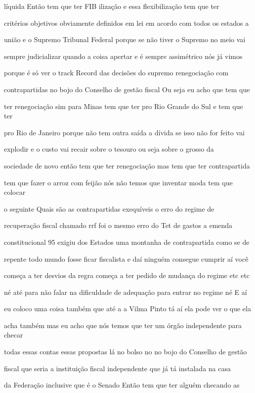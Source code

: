 \documentclass[a4paper,12pt]{article}
\begin{document}
líquida Então tem que ter FIB ilização e essa flexibilização tem que ter

critérios objetivos obviamente definidos em lei em acordo com todos os estados a

união e o Supremo Tribunal Federal porque se não tiver o Supremo no meio vai

sempre judicializar quando a coisa apertar e é sempre assimétrico nós já vimos

porque é só ver o track Record das decisões do supremo renegociação com

contrapartidas no bojo do Conselho de gestão fiscal Ou seja eu acho que tem que

ter renegociação sim para Minas tem que ter pro Rio Grande do Sul e tem que ter

pro Rio de Janeiro porque não tem outra saída a dívida se isso não for feito vai

explodir e o custo vai recair sobre o tesouro ou seja sobre o grosso da

sociedade de novo então tem que ter renegociação mas tem que ter contrapartida

tem que fazer o arroz com feijão nós não temos que inventar moda tem que colocar

o seguinte Quais são as contrapartidas exequíveis o erro do regime de

recuperação fiscal chamado rrf foi o mesmo erro do Tet de gastos a emenda

constitucional 95 exigiu dos Estados uma montanha de contrapartida como se de

repente todo mundo fosse ficar fiscalista e daí ninguém consegue cumprir aí você

começa a ter desvios da regra começa a ter pedido de mudança do regime etc etc

né até para não falar na dificuldade de adequação para entrar no regime né E aí

eu coloco uma coisa também que até a a Vilma Pinto tá aí ela pode ver o que ela

acha também mas eu acho que nós temos que ter um órgão independente para checar

todas essas contas essas propostas lá no bolso no no bojo do Conselho de gestão

fiscal que seria a instituição fiscal independente que já tá instalada na casa

da Federação inclusive que é o Senado Então tem que ter alguém checando as
\end{document}
